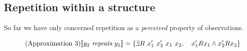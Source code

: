 


\subsection{Repetition within a structure}



So far we have only concerned repetition as a \emph{perceived} property of observations. 



\begin{equation} 
    \tag{Approximation 3}
    \llbracket y_2 \ \emph{repeats}\  y_1  \rrbracket = \left\{ \exists R\ x_1' \ x_2' \ x_1\ x_2,\quad  x_1' R x_1 \wedge   x_2' R x_2 \right\}
\end{equation}






